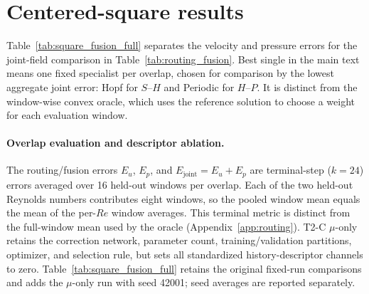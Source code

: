 \section{Centered-square results}
\label{app:square}

Table~\ref{tab:square_fusion_full} separates the velocity and pressure errors
for the joint-field comparison in Table~\ref{tab:routing_fusion}. Best single
in the main text means one fixed specialist per overlap, chosen for comparison
by the lowest aggregate joint error: Hopf for $S$--$H$ and Periodic for $H$--$P$.
It is distinct from the window-wise convex oracle, which uses the reference
solution to choose a weight for each evaluation window.

\paragraph{Overlap evaluation and descriptor ablation.}
The routing/fusion errors $E_u$, $E_p$, and $E_{\mathrm{joint}}=E_u+E_p$ are
terminal-step ($k=24$) errors averaged over 16 held-out windows per overlap.
Each of the two held-out Reynolds numbers contributes eight windows, so the
pooled window mean equals the mean of the per-$Re$ window averages. This
terminal metric is distinct from the full-window mean used by the oracle
(Appendix~\ref{app:routing}). T2-C $\mu$-only retains the correction network,
parameter count, training/validation partitions, optimizer, and selection
rule, but sets all standardized history-descriptor channels to zero.
Table~\ref{tab:square_fusion_full} retains the original fixed-run comparisons
and adds the $\mu$-only run with seed 42001; seed averages are reported separately.

